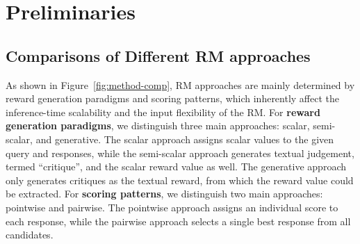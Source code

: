 \documentclass{article} %
\begin{document}
\vspace{-1em}
\section{Preliminaries}
\label{sec:prelim}



\vspace{-0.5em}
\subsection{Comparisons of Different RM approaches}
\label{sec:method-comp}

As shown in Figure~\ref{fig:method-comp}, RM approaches are mainly determined by reward generation paradigms and scoring patterns, which inherently affect the inference-time scalability and the input flexibility of the RM. For \textbf{reward generation paradigms}, we distinguish three main approaches: scalar, semi-scalar, and generative. The scalar approach assigns scalar values to the given query and responses, while the semi-scalar approach generates textual judgement, termed ``critique'', and the scalar reward value as well. The generative approach only generates critiques as the textual reward, from which the reward value could be extracted. For \textbf{scoring patterns}, we distinguish two main approaches: pointwise and pairwise. The pointwise approach assigns an individual score to each response, while the pairwise approach selects a single best response from all candidates. 
\end{document}
